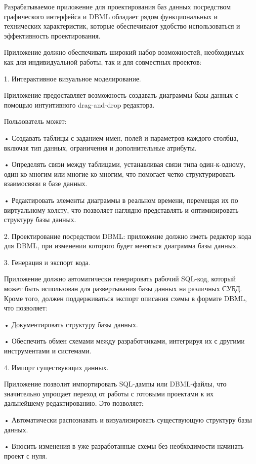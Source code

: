 Разрабатываемое приложение для проектирования баз данных посредством графического интерфейса и DBML обладает рядом функциональных и технических характеристик, которые обеспечивают удобство использоваться и эффективность проектирования.

Приложение должно обеспечивать широкий набор возможностей, необходимых как для индивидуальной работы, так и для совместных проектов:

1. Интерактивное визуальное моделирование.

Приложение предоставляет возможность создавать диаграммы базы данных с помощью интуитивного drag-and-drop редактора.

Пользователь может:

• Создавать таблицы с заданием имен, полей и параметров каждого столбца, включая тип данных, ограничения и дополнительные атрибуты.

• Определять связи между таблицами, устанавливая связи типа один-к-одному, один-ко-многим или многие-ко-многим, что помогает четко структурировать взаимосвязи в базе данных.

• Редактировать элементы диаграммы в реальном времени, перемещая их по виртуальному холсту, что позволяет наглядно представлять и оптимизировать структуру базы данных.

2. Проектирование посредством DBML: приложение должно иметь редактор кода для DBML, при изменении которого будет меняться диаграмма базы данных.

3. Генерация и экспорт кода.

Приложение должно автоматически генерировать рабочий SQL-код, который может быть использован для развертывания базы данных на различных СУБД. Кроме того, должен поддерживаться экспорт описания схемы в формате DBML, что позволяет:

• Документировать структуру базы данных.

• Обеспечить обмен схемами между разработчиками, интегрируя их с другими инструментами и системами.


4. Импорт существующих данных.

Приложение позволит импортировать SQL-дампы или DBML-файлы, что значительно упрощает переход от работы с готовыми проектами к их дальнейшему редактированию. Это позволяет:

• Автоматически распознавать и визуализировать существующую структуру базы данных.

• Вносить изменения в уже разработанные схемы без необходимости начинать проект с нуля.


